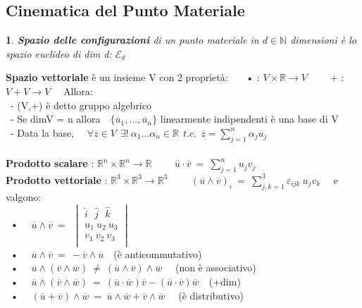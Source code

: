 \documentclass{article}
\theoremstyle{unnumbered}
\theoremstyle{unnumbered1}
\newtheorem* {theoremT1}{}
\newenvironment{Ndefi}{\begin{gBox}\begin{theoremT1}}{\end{theoremT1}\end{gBox}}
\begin{document}
\subsection{Cinematica del Punto Materiale}
%
\begin{Ndefi}
\textbf{Spazio delle configurazioni} di un punto materiale in $d\in\mathbb{N}$ dimensioni è lo spazio euclideo di dim d: $\mathcal{E}_d$
\end{Ndefi}
%
%
%
\textbf{Spazio vettoriale} è un insieme V con 2 proprietà: \ \ \
• : $V\times\mathbb{R}\rightarrow V$ \ \ \ \ + : $V+V\rightarrow V$ \ \ Allora:\\
\ - (V,+) è detto gruppo algebrico\\
\ - Se dimV = n allora  $\ \ \ \{\overline{u}_1,...,\overline{u}_n\}$ linearmente indipendenti è una base di V \\
\ - Data la base, \ \ $\forall \overline{z} \in V \ \ \exists! \ \alpha_1 ... \alpha_n \in\mathbb{R} \ \ t.c. \ \ \overline{z}=\sum_{j=1}^n\alpha_j\overline{u}_j$\\ \\
%
%
%
\textbf{Prodotto scalare} : $\mathbb{R}^n \times\mathbb{R}^n\rightarrow\mathbb{R}$ \ \ \ \ $\overline{u} \cdot \overline{v} \ = \ \sum^n_{j=1}u_jv_j$ \\
\textbf{Prodotto vettoriale} : $\mathbb{R}^3 \times\mathbb{R}^3\rightarrow\mathbb{R}^3$ \ \ \ \ $(\overline{u} \wedge \overline{v})_i \ = \ \sum^3_{j,k=1}\varepsilon_{ijk}\ u_jv_k$ \ \ e valgono:\\
\ • \ \ $\overline{u} \wedge \overline{v} \ = \ \
\begin{vmatrix}
\hat{i} \ \ \ \hat{j}  \ \ \ \hat{k} \\
u_1 \ u_2 \ u_3 \\
v_1 \ v_2 \ v_3 \\
\end{vmatrix}$ \\
\ • \ \ $\overline{u} \wedge \overline{v} \ = \ - \overline{v} \wedge \overline{u}$\ \ (è anticommutativo) \\
\ • \ \ $\overline{u} \wedge (\overline{v} \wedge \overline{w}) \ \neq \ (\overline{u} \wedge \overline{v}) \wedge \overline{w}$ \ \ (non è associativo)\\
\ • \ \ $\overline{u} \wedge (\overline{v} \wedge \overline{w}) \ = \ (\overline{u}\cdot\overline{w})\overline{v} - (\overline{u}\cdot\overline{v})\overline{w}$\ \ (+dim) \\
\ • \ \ $(\overline{u}+\overline{v})\wedge \overline{w} \ = \ \overline{u}\wedge \overline{w} + \overline{v}\wedge\overline{w}$ \ \ (è distributivo)  \\ \\
\end{document}

